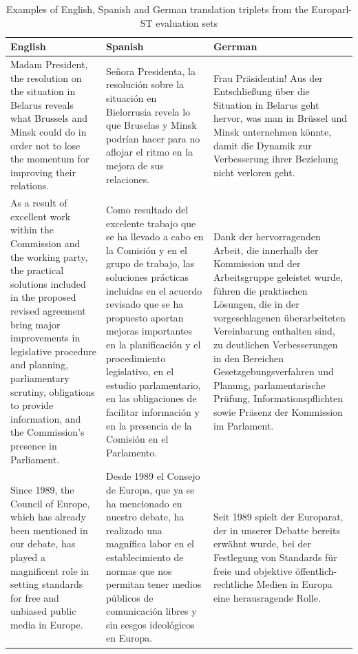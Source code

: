 \documentclass[11pt,english,listoffigures,listoftables]{tfgetsinf}
\begin{document}
\begin{table}[]
\begin{tabular}{p{5cm} | p{5cm} | p{5cm}}
         \hline
    \end{tabular}
\end{table}

\begin{table}[]
    \centering
    \caption{Examples of English, Spanish and German translation triplets from the Europarl-ST evaluation sets}
    \label{tab:examples_test_euro}
    \begin{tabular}{p{5cm} | p{5cm} | p{5cm}}
         English & Spanish & Gerrman \\
         \hline \hline
         Madam President, the resolution on the situation in Belarus reveals what Brussels and Minsk could do in order not to lose the momentum for improving their relations. & Señora Presidenta, la resolución sobre la situación en Bielorrusia revela lo que Bruselas y Minsk podrían hacer para no aflojar el ritmo en la mejora de sus relaciones. & Frau Präsidentin! Aus der Entschließung über die Situation in Belarus geht hervor, was man in Brüssel und Minsk unternehmen könnte, damit die Dynamik zur Verbesserung ihrer Beziehung nicht verloren geht. \\
         \hline 
         As a result of excellent work within the Commission and the working party, the practical solutions included in the proposed revised agreement bring major improvements in legislative procedure and planning, parliamentary scrutiny, obligations to provide information, and the Commission's presence in Parliament. & Como resultado del excelente trabajo que se ha llevado a cabo en la Comisión y en el grupo de trabajo, las soluciones prácticas incluidas en el acuerdo revisado que se ha propuesto aportan mejoras importantes en la planificación y el procedimiento legislativo, en el estudio parlamentario, en las obligaciones de facilitar información y en la presencia de la Comisión en el Parlamento. & Dank der hervorragenden Arbeit, die innerhalb der Kommission und der Arbeitsgruppe geleistet wurde, führen die praktischen Lösungen, die in der vorgeschlagenen überarbeiteten Vereinbarung enthalten sind, zu deutlichen Verbesserungen in den Bereichen Gesetzgebungsverfahren und Planung, parlamentarische Prüfung, Informationspflichten sowie Präsenz der Kommission im Parlament. \\
         \hline
         Since 1989, the Council of Europe, which has already been mentioned in our debate, has played a magnificent role in setting standards for free and unbiased public media in Europe. & Desde 1989 el Consejo de Europa, que ya se ha mencionado en nuestro debate, ha realizado una magnífica labor en el establecimiento de normas que nos permitan tener medios públicos de comunicación libres y sin sesgos ideológicos en Europa. & Seit 1989 spielt der Europarat, der in unserer Debatte bereits erwähnt wurde, bei der Festlegung von Standards für freie und objektive öffentlich-rechtliche Medien in Europa eine herausragende Rolle. \\

\end{tabular}
\end{table}
\end{document}
